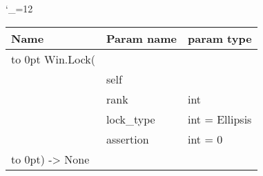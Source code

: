 \begingroup \catcode`\_=12 \tt
\begin{tabular}{lll}
\toprule
\textrm{Name}&\textrm{Param name}&\textrm{param type}\\
\midrule
\hbox to 0pt {Win.Lock(\hss}\\
& self\\
& rank & int\\
& lock_type & int = Ellipsis\\
& assertion & int = 0\\
\hbox to 0pt{) -> None\hss}\\
\bottomrule
\end{tabular}
\endgroup
